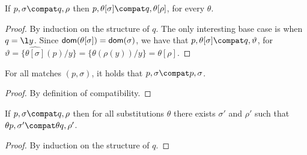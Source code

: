 \documentclass{LMCS}
\begin{document}
\begin{lem}
\label{lem:compat-compose-subs}
If $p,\sigma \compat q,\rho$ then $p,\theta[\sigma] \compat q,\theta[\rho]$, for every $\theta$.
\end{lem}
\begin{proof}
By induction on the structure of $q$. The only interesting base case is when $q = \l y$.
Since ${\sf dom}(\theta[\sigma]) = {\sf dom}(\sigma)$, we have that
$p,\theta[\sigma] \compat q,\vartheta$, for $\vartheta = \{ \widehat{\theta[\sigma]}(p)/y\}
= \{\theta(\rho(y))/y\} = \theta[\rho]$.
\end{proof}

\begin{prop}
\label{prop:compat-reflexive}
For all matches $(p,\sigma)$, it holds that $p,\sigma\compat p,\sigma$.
\end{prop}
\begin{proof}
By definition of compatibility.
\end{proof}

\begin{prop}
\label{prop:compat-sub-closed}
If $p,\sigma\compat q,\rho$ then for all substitutions $\theta$ there exists
$\sigma '$ and $\rho '$ such that
$\theta p, \sigma '\compat \theta q,\rho '$.
\end{prop}
\begin{proof}
By induction on the structure of $q$.
\end{proof}
\end{document}
